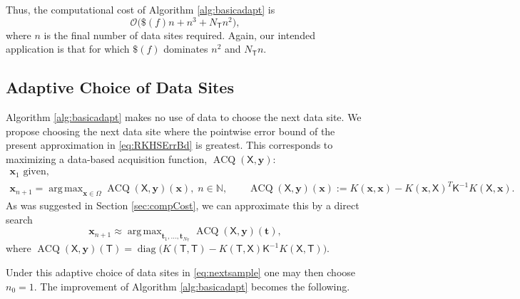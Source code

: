 \documentclass[]{mcom-l}
\theoremstyle{remark}
\DeclareMathOperator*{\argmax}{arg\,max}
\DeclareMathOperator{\ACQ}{ACQ}
\DeclareMathOperator{\diag}{diag}
\newcommand{\NT}{{N_{\mT}}}
\newcommand{\naturals}{{\mathbb{N}}}
\newcommand{\mK}{\mathsf{K}}
\newcommand{\mT}{\mathsf{T}}
\newcommand{\mX}{\mathsf{X}}
\newcommand{\bx}{{\boldsymbol{x}}}
\newcommand{\by}{{\boldsymbol{y}}}
\newcommand{\bt}{{\boldsymbol{t}}}
\newcommand{\Order}{\mathcal{O}}
\begin{document}
Thus, the computational cost of Algorithm \ref{alg:basicadapt} is
\begin{equation} \label{eq:compcostbasic}
\Order\bigl(\$(f)n + n^3 + \NT n^2 \bigr),
\end{equation}
where $n$ is the final number of data sites required.  Again, our intended application is that for which $\$(f)$ dominates $n^2$ and $\NT n$.  



\subsection{Adaptive Choice of Data Sites }  \label{sec:adaptSites}

Algorithm \ref{alg:basicadapt} makes no use of data to choose the next data site.  We propose choosing  the next data site where the pointwise error bound of the present approximation in \eqref{eq:RKHSErrBd} is greatest.  This corresponds to maximizing a data-based acquisition function, $\ACQ(\mX,\by)$:
\begin{subequations} \label{eq:nextsample}
\begin{gather} 
\bx_1 \text{ given}, \\
 \bx_{n+1} = \argmax_{\bx \in \Omega} \ACQ(\mX,\by)(\bx), \; n \in \naturals,  \qquad \ACQ(\mX,\by)(\bx) := K(\bx,\bx) - K(\bx,\mX)^T \mK^{-1} K(\mX,\bx).
\end{gather}
\end{subequations}
As was suggested in Section \ref{sec:compCost}, we can approximate this by a direct search
\begin{equation} \label{eq:nextsampleAPPX}
\bx_{n+1} \approx \argmax_{\bt_1, \ldots, \bt_\NT} \ACQ(\mX,\by)(\bt),
\end{equation}
where $\ACQ(\mX,\by)(\mT) = \diag\bigl(K(\mT,\mT) - K(\mT,\mX) \mK^{-1} K(\mX,\mT) \bigr)$.  

Under this adaptive choice of data sites in  \eqref{eq:nextsample} one may then choose $n_0 = 1$.  The improvement of Algorithm \ref{alg:basicadapt} becomes the following. 
\end{document}
